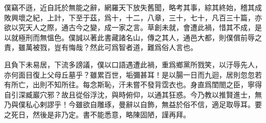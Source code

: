 僕竊不遜，近自託於無能之辭，網羅天下放失舊聞，略考其事，綜其終始，稽其成敗興壞之紀，上計，下至于茲，爲十，十二，八章，三十，七十，凡百三十篇，亦欲以究天人之際，通古今之變，成一家之言。草創未就，會遭此禍，惜其不成，是以就極刑而無慍色。僕誠以著此書藏諸名山，傳之其人，通邑大都，則僕償前辱之責，雖萬被戮，豈有悔哉？然此可爲智者道，難爲俗人言也。

且負下未易居，下流多謗議，僕以口語遇遭此禍，重爲鄉黨所戮笑，以汙辱先人，亦何面目復上父母丘墓乎？雖累百世，垢彌甚耳！是以腸一日而九迴，居則忽忽若有所亡，出則不知所往。每念斯恥，汗未嘗不發背霑衣也。身直爲閨閤之臣，寧得自引深臧巖穴邪？故且從俗浮沈，與時俯仰，以通其狂惑。今乃教以推賢進士，無乃與僕私心剌謬乎！今雖欲自雕琢，曼辭以自飾，無益於俗不信，適足取辱耳。要之死日，然後是非乃定。書不能悉意，略陳固陋，謹再拜。 

\theendnotes

